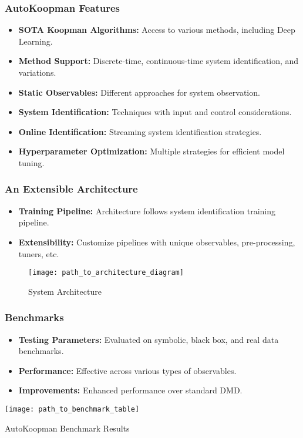 \documentclass[shortpres,aspectratio=43]{beamer}
\begin{document}
\begin{frame}
\frametitle{AutoKoopman Features}
\begin{itemize}
    \item<1-> \textbf{SOTA Koopman Algorithms:} Access to various methods, including Deep Learning.
    \item<2-> \textbf{Method Support:} Discrete-time, continuous-time system identification, and variations.
    \item<3-> \textbf{Static Observables:} Different approaches for system observation.
    \item<4-> \textbf{System Identification:} Techniques with input and control considerations.
    \item<5-> \textbf{Online Identification:} Streaming system identification strategies.
    \item<6-> \textbf{Hyperparameter Optimization:} Multiple strategies for efficient model tuning.
\end{itemize}
\end{frame}

\begin{frame}
\frametitle{An Extensible Architecture}
\begin{itemize}
    \item<1-> \textbf{Training Pipeline:} Architecture follows system identification training pipeline.
    \item<2-> \textbf{Extensibility:} Customize pipelines with unique observables, pre-processing, tuners, etc.
\end{itemize}
\begin{figure}
  \centering
  \texttt{[image: path\_to\_architecture\_diagram]} %
  \caption{System Architecture}
\end{figure}
\end{frame}

\begin{frame}
\frametitle{Benchmarks}
\begin{itemize}
    \item<1-> \textbf{Testing Parameters:} Evaluated on symbolic, black box, and real data benchmarks.
    \item<2-> \textbf{Performance:} Effective across various types of observables.
    \item<3-> \textbf{Improvements:} Enhanced performance over standard DMD.
\end{itemize}
\begin{table}
  \centering
  \texttt{[image: path\_to\_benchmark\_table]} %
  \caption{AutoKoopman Benchmark Results}
\end{table}
\end{frame}
\end{document}
